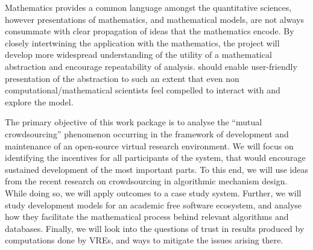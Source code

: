 \begin{workpackage}[id=social-aspects,wphases=1-48!.5,
  title=Social Aspects,
  lead=UO,
  UORM=1,USHRM=8, USORM=5]


\begin{wpobjectives}

Mathematics provides a common language amongst the quantitative
sciences, however presentations of mathematics, and mathematical
models, are not always consummate with clear propagation of ideas that
the mathematics encode. By closely intertwining the application with
the mathematics, the project will develop more widespread
understanding of the utility of a mathematical abstraction and
encourage repeatability of analysis. \TheProject should enable
user-friendly presentation of the abstraction to such an extent that
even non computational/mathematical scientists feel compelled to
interact with and explore the model.



The primary objective of this work package is to analyse the ``mutual
crowdsourcing'' phenomenon occurring in the framework of development
and maintenance of an open-source virtual research environment.  We
will focus on identifying the incentives for all participants of the
system, that would encourage sustained development of the most
important parts.  To this end, we will use ideas from the recent
research on crowdsourcing in algorithmic mechanism design.  While
doing so, we will apply outcomes to a case study system.  Further, we
will study development models for an academic free software ecosystem,
and analyse how they facilitate the mathematical process behind
relevant algorithms and databases.  Finally, we will look into the
questions of trust in results produced by computations done by VREs,
and ways to mitigate the issues arising there.

\end{wpobjectives}


\end{workpackage}
